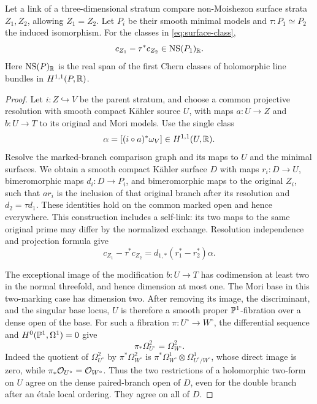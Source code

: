 \begin{lemma}\label{lem:class-link}
Let a link of a three-dimensional stratum compare non-Moishezon surface
strata \(Z_1,Z_2\), allowing \(Z_1=Z_2\).  Let \(P_i\) be their smooth
minimal models and \(\tau:P_1\simeq P_2\) the induced isomorphism.  For
the classes in \eqref{eq:surface-class},
\begin{equation}\label{eq:class-mod-ns}
 c_{Z_1}-\tau^*c_{Z_2}\in\operatorname{NS}(P_1)_\mathbb R.
\end{equation}
Here \(\operatorname{NS}(P)_\mathbb R\) is the real span of the first Chern classes of
holomorphic line bundles in \(H^{1,1}(P,\mathbb R)\).
\end{lemma}
\begin{proof}
Let \(i:Z\hookrightarrow V\) be the parent stratum, and choose a common
projective resolution with smooth compact K\"ahler source \(U\), with
maps \(a:U\to Z\) and \(b:U\to T\) to its original and Mori models.
Use the single class
\[
 \alpha=[(i\circ a)^*\omega_V]\in H^{1,1}(U,\mathbb R).
\]
Resolve the marked-branch comparison graph and its maps to \(U\) and
the minimal surfaces.  We obtain a smooth compact K\"ahler surface \(D\)
with maps \(r_i:D\to U\), bimeromorphic maps \(d_i:D\to P_i\), and
bimeromorphic maps to the original \(Z_i\), such that \(a r_i\) is the
inclusion of that original branch after its resolution and
\(d_2=\tau d_1\).  These identities hold on the
common marked open and hence everywhere.  This construction includes a
self-link: its two maps to the same original prime may differ by the
normalized exchange.  Resolution independence and projection formula give
\begin{equation}\label{eq:class-correspondence}
 c_{Z_1}-\tau^*c_{Z_2}
 =d_{1,*}(r_1^*-r_2^*)\alpha.
\end{equation}

The exceptional image of the modification \(b:U\to T\) has codimension
at least two in the normal threefold, and hence dimension at most one.
The Mori base in this two-marking case has dimension two.  After removing
its image, the discriminant, and the singular base locus, \(U\) is
therefore a smooth proper \(\mathbb P^1\)-fibration over a dense open of the
base.  For such a fibration \(\pi:U^\circ\to W^\circ\), the differential
sequence and \(H^0(\mathbb P^1,\Omega^1)=0\) give
\[
 \pi_*\Omega^2_{U^\circ}=\Omega^2_{W^\circ}.
\]
Indeed the quotient of \(\Omega^2_{U^\circ}\) by
\(\pi^*\Omega^2_{W^\circ}\) is
\(\pi^*\Omega^1_{W^\circ}\otimes\Omega^1_{U^\circ/W^\circ}\), whose
direct image is zero, while \(\pi_*\mathcal O_{U^\circ}=\mathcal O_{W^\circ}\).
Thus the two restrictions of a holomorphic two-form on \(U\) agree on
the dense paired-branch open of \(D\), even for the double branch after
an \'etale local ordering.  They agree on all of \(D\).


\end{proof}
